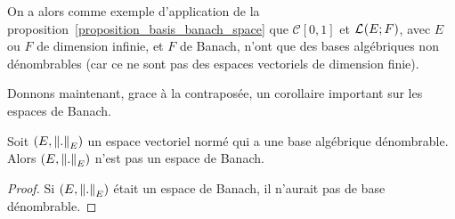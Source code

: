 On a alors comme exemple d'application de la
proposition~\ref{proposition_basis_banach_space} que $\mathcal{C}[0, 1]$ et
$\mathcal{L}_{}(E; F)$, avec $E$ ou $F$ de dimension infinie, et $F$ de Banach,
n'ont que des bases algébriques non dénombrables (car ce ne sont pas des espaces
vectoriels de dimension finie).

Donnons maintenant, grace à la contraposée, un corollaire important sur les espaces de
Banach.

\begin{corollary}
	Soit $(E, \norm{.}_{E})$ un espace vectoriel normé qui a
	une base algébrique dénombrable.
	Alors $(E, \norm{.}_{E})$ n'est pas un espace de Banach.
\end{corollary}

\ifdefined\outputproof
\begin{proof}
	Si $(E, \norm{.}_{E})$ était un espace de Banach, il
	n'aurait pas de base dénombrable.
\end{proof}
\fi
